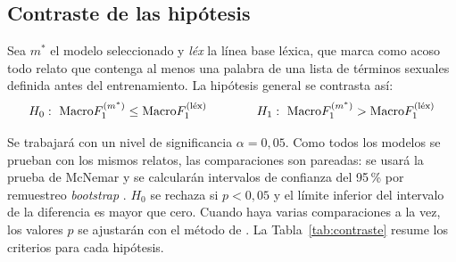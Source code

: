 \subsection{Contraste de las hipótesis}
Sea $m^{*}$ el modelo seleccionado y \textit{léx} la línea base léxica, que marca como acoso todo relato que contenga al menos una palabra de una lista de términos sexuales definida antes del entrenamiento. La hipótesis general se contrasta así:
\begin{equation}
\ecuacion{Hipótesis estadística general}
H_0:\ \text{Macro}F_1^{(m^{*})} \leq \text{Macro}F_1^{(\text{léx})}
\qquad\qquad
H_1:\ \text{Macro}F_1^{(m^{*})} > \text{Macro}F_1^{(\text{léx})}
\label{eq:hipotesis}
\end{equation}

Se trabajará con un nivel de significancia $\alpha = 0{,}05$. Como todos los modelos se prueban con los mismos relatos, las comparaciones son pareadas: se usará la prueba de McNemar \citep{mcnemar1947, dietterich1998} y se calcularán intervalos de confianza del 95\,\% por remuestreo \textit{bootstrap} \citep{efron1993}. $H_0$ se rechaza si $p < 0{,}05$ y el límite inferior del intervalo de la diferencia es mayor que cero. Cuando haya varias comparaciones a la vez, los valores $p$ se ajustarán con el método de \citet{holm1979}. La Tabla~\ref{tab:contraste} resume los criterios para cada hipótesis.

